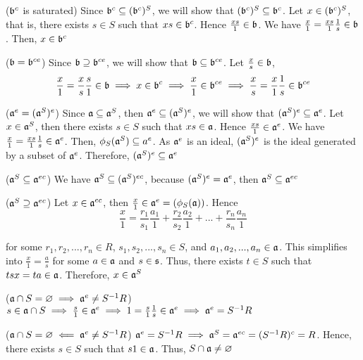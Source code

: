 \begin{longproof}
	($\mathfrak{b}^c$ is saturated) Since $\mathfrak{b}^c \subseteq (\mathfrak{b}^c)^S$, we will show that $(\mathfrak{b}^c)^S \subseteq \mathfrak{b}^c$. Let $x \in (\mathfrak{b}^c)^S$, that is, there exists $s \in S$ such that $xs \in \mathfrak{b}^c$. Hence $\frac{xs}{1} \in \mathfrak{b}$. We have $\frac{x}{1} = \frac{xs}{1} \frac{1}{s} \in \mathfrak{b}$. Then, $x \in \mathfrak{b}^c$
	
	($\mathfrak{b} = \mathfrak{b}^{ce}$) Since $\mathfrak{b} \supseteq \mathfrak{b}^{ce}$, we will show that $\mathfrak{b} \subseteq \mathfrak{b}^{ce}$. Let $\frac{x}{s} \in \mathfrak{b}$, 
	$$
		\frac{x}{1} = \frac{x}{s} \frac{s}{1} \in \mathfrak{b} \implies x \in \mathfrak{b}^c \implies \frac{x}{1} \in \mathfrak{b}^{ce} \implies \frac{x}{s} = \frac{x}{1} \frac{1}{s} \in \mathfrak{b}^{ce}
	$$
	
	
	($\mathfrak{a}^e = (\mathfrak{a}^S)^e$) Since $\mathfrak{a} \subseteq \mathfrak{a}^S$, then $\mathfrak{a}^e \subseteq (\mathfrak{a}^S)^e$, we will show that $(\mathfrak{a}^S)^e \subseteq \mathfrak{a}^e$. Let $x \in \mathfrak{a}^S$, then there exists $s \in S$ such that $xs \in \mathfrak{a}$. Hence $\frac{xs}{1} \in \mathfrak{a}^e$. We have $\frac{x}{1} = \frac{xs}{1} \frac{1}{s} \in \mathfrak{a}^e$. Then, $\phi_S(\mathfrak{a}^S) \subseteq a^e$. As $\mathfrak{a}^e$ is an ideal, $(\mathfrak{a}^S)^e$ is the ideal generated by a subset of $\mathfrak{a}^e$. Therefore, $(\mathfrak{a}^S)^e \subseteq \mathfrak{a}^e$
	
	($\mathfrak{a}^S \subseteq \mathfrak{a}^{ec}$) We have $\mathfrak{a}^S \subseteq (\mathfrak{a}^S)^{ec}$, because $(\mathfrak{a}^S)^e = \mathfrak{a}^e$, then $\mathfrak{a}^S \subseteq \mathfrak{a}^{ec}$
	
	($\mathfrak{a}^S \supseteq \mathfrak{a}^{ec}$) Let $x \in \mathfrak{a}^{ec}$, then $\frac{x}{1} \in \mathfrak{a}^e = (\phi_S(\mathfrak{a}))$. Hence
	$$
		\frac{x}{1} = \frac{r_1}{s_1} \frac{a_1}{1} + \frac{r_2}{s_2} \frac{a_2}{1} + ... + \frac{r_n}{s_n} \frac{a_n}{1}
	$$
	
	for some $r_1, r_2, ..., r_n \in R$, $s_1, s_2, ..., s_n \in S$, and $a_1, a_2, ..., a_n \in \mathfrak{a}$. This simplifies into $\frac{x}{1} = \frac{a}{s}$ for some $a \in \mathfrak{a}$ and $s \in \mathfrak{s}$. Thus, there exists $t \in S$ such that $tsx = ta \in \mathfrak{a}$. Therefore, $x \in \mathfrak{a}^S$
	
	($\mathfrak{a} \cap S = \varnothing \implies \mathfrak{a}^e \neq S^{-1} R$) 
	$
		s \in \mathfrak{a} \cap S \implies \frac{s}{1} \in \mathfrak{a}^e \implies 1 = \frac{s}{1} \frac{1}{s} \in \mathfrak{a}^e \implies \mathfrak{a}^e = S^{-1} R
	$
	
	($\mathfrak{a} \cap S = \varnothing \impliedby \mathfrak{a}^e \neq S^{-1} R$)  $\mathfrak{a}^e = S^{-1}R \implies \mathfrak{a}^S = \mathfrak{a}^{ec} = (S^{-1} R)^c = R$. Hence, there exists $s \in S$ such that $s1 \in \mathfrak{a}$. Thus, $S \cap \mathfrak{a} \neq \varnothing$
	

\end{longproof}
